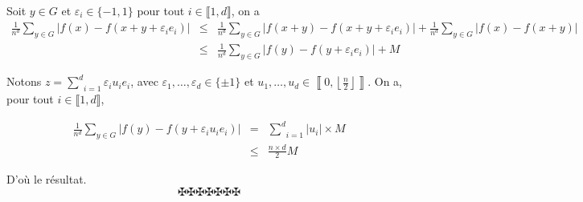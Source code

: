 Soit $y \in G$ et $\varepsilon_i \in \{ - 1, 1 \}$ pour tout $i \in \llbracket
1, d \rrbracket$, on a
\begin{eqnarray*}
  \frac{1}{n^d} \underset{y \in G}{\sum} | f (x) - f (x + y + \varepsilon_i
  e_i) | & \leqslant & \frac{1}{n^d} \underset{y \in G}{\sum} | f (x + y) - f
  (x + y + \varepsilon_i e_i) | + \frac{1}{n^d} \underset{y \in G}{\sum} | f
  (x) - f (x + y) |\\
  & \leqslant & \frac{1}{n^d} \underset{y \in G}{\sum} | f (y) - f (y +
  \varepsilon_i e_i) | + M
\end{eqnarray*}


Notons $z = \underset{i = 1}{\overset{d}{\sum}} \varepsilon_i u_i e_i$, avec
$\varepsilon_1, \ldots, \varepsilon_d \in \{ \pm 1 \}$ et $u_1, \ldots, u_d
\in \left\llbracket 0, \left\lfloor \frac{n}{2} \right\rfloor
\right\rrbracket$. On a, pour tout $i \in \llbracket 1, d \rrbracket$,


\begin{eqnarray*}
  \frac{1}{n^d} \underset{y \in G}{\sum} | f (y) - f (y + \varepsilon_i u_i
  e_i) | & = & \underset{i = 1}{\overset{d}{\sum}} | u_i | \times M\\
  & \leqslant & \frac{n \times d}{2} M
\end{eqnarray*}


D'o{\`u} le r{\'e}sultat.
\[ \maltese \maltese \maltese \maltese \maltese \maltese \maltese \]
